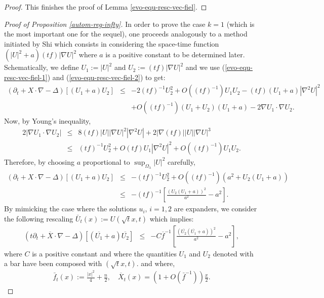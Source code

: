 \documentclass[a4paper,11pt,reqno]{amsart}
\begin{document}
\begin{proof}
This finishes the proof of Lemma \ref{evo-equ-resc-vec-fiel}.
\end{proof}

\begin{proof}[Proof of Proposition \ref{autom-reg-infty}]
In order to prove the case $k=1$ (which is the most important one for the sequel), one proceeds analogously to a method initiated by Shi \cite{Shi-Def} which consists in considering the space-time function $(|U|^2+a)(tf)|\nabla U|^2$ where $a$ is a positive constant to be determined later. Schematically, we define $U_1:=|U|^2$ and $U_2:=(tf)|\nabla U|^2$ and we use (\ref{evo-equ-resc-vec-fiel-1}) and (\ref{evo-equ-resc-vec-fiel-2}) to get:
\begin{eqnarray*}
\left(\partial_t+X\cdot\nabla-\Delta \right)[(U_1+a)U_2]&\leq& -2(tf)^{-1}U_2^2+\textit{O}((tf)^{-1})U_1U_2-(tf)(U_1+a)|\nabla^2U|^2\\
&&+\textit{O}((tf)^{-1})(U_1+U_2)(U_1+a)-2\nabla U_1\cdot\nabla U_2.
\end{eqnarray*}
Now, by Young's inequality,
\begin{eqnarray*}
2|\nabla U_1\cdot\nabla U_2|&\leq& 8(tf)|U||\nabla U|^2|\nabla^2U|+2|\nabla (tf)||U||\nabla U|^3\\
&\leq&(tf)^{-1}U_2^2+\textit{O}(tf)U_1|\nabla^2U|^2+\textit{O}((tf)^{-1})U_1U_2.
\end{eqnarray*}
Therefore, by choosing $a$ proportional to $\sup_{\Omega_{\lambda}}|U|^2$ carefully,
\begin{eqnarray*}
\left(\partial_t+X\cdot\nabla-\Delta \right)[(U_1+a)U_2]&\leq&-(tf)^{-1}U_2^2+\textit{O}((tf)^{-1})(a^2+U_2(U_1+a))\\
&\leq&-(tf)^{-1}\left[\frac{(U_2(U_1+a))^2}{a^2}-a^2\right].
\end{eqnarray*}
By mimicking the case where the solutions $u_i$, $i=1,2$ are expanders, we consider the following rescaling $\bar{U}_t(x):=U(\sqrt{t}x,t)$ which implies:
\begin{eqnarray*}
\left(t\partial_t+\overline{X}\cdot\nabla-\Delta \right)[(\overline{U_1}+a)\overline{U_2}]&\leq&-C\overline{f}^{-1}\left[\frac{(\overline{U_2}(\overline{U_1}+a))^2}{a^2}-a^2\right],
\end{eqnarray*}
where $C$ is a positive constant and where the quantities $U_1$ and $U_2$ denoted with a bar have been composed with $(\sqrt{t}x,t)$. and where,
\begin{eqnarray*}
\bar{f}_t(x):=\frac{|x|^2}{4}+\frac{n}{2},\quad \overline{X}_t(x)=(1+\textit{O}(\bar{f}^{-1}))\frac{x}{2}.
\end{eqnarray*}

\end{proof}
\end{document}
